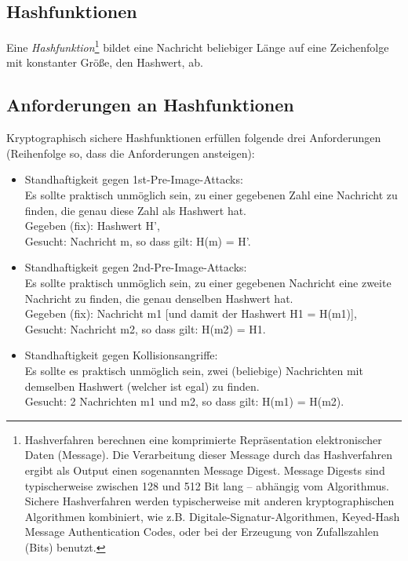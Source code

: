 \begin{refsegment}
\section{Hashfunktionen}
Eine {\em Hashfunktion}\footnote{%
Hashverfahren berechnen eine komprimierte Repräsentation
elektronischer Daten (Message).
Die Verarbeitung dieser Message durch das Hashverfahren ergibt als Output
einen sogenannten Message Digest. Message Digests sind typischerweise
zwischen 128 und 512 Bit lang -- abhängig vom Algorithmus.
Sichere Hashverfahren werden typischerweise mit anderen kryptographischen
Algorithmen kombiniert, wie z.B. Digitale-Signatur-Algorithmen,
Keyed-Hash Message Authentication Codes, oder bei der Erzeugung von
Zufallszahlen (Bits) benutzt.
}
bildet eine Nachricht beliebiger Länge auf eine Zeichenfolge mit
konstanter Größe, den 
Hashwert, ab.



\subsection{Anforderungen an Hashfunktionen}

Kryptographisch sichere Hashfunktionen erfüllen folgende drei Anforderungen
(Reihenfolge so, dass die Anforderungen ansteigen):
\begin{itemize}
 \item Standhaftigkeit gegen 1st-Pre-Image-Attacks:
       \\
      Es sollte praktisch unmöglich sein, zu einer gegebenen Zahl eine
      Nachricht zu finden, die genau diese Zahl als Hashwert hat.\\
      Gegeben (fix): Hashwert H',\\
      Gesucht: Nachricht m, so dass gilt: H(m) = H'.
 \item Standhaftigkeit gegen 2nd-Pre-Image-Attacks:
       \\
      Es sollte praktisch unmöglich sein, zu einer gegebenen Nachricht
      eine zweite Nachricht zu finden, die genau denselben Hashwert hat.\\
      Gegeben (fix): Nachricht m1 [und damit der Hashwert H1 = H(m1)],\\
      Gesucht: Nachricht m2, so dass gilt: H(m2) = H1.
 \item Standhaftigkeit gegen Kollisionsangriffe:
      \\
      Es sollte es praktisch unmöglich sein, zwei (beliebige) Nachrichten
      mit demselben Hashwert (welcher ist egal) zu finden.\\
      Gesucht: 2 Nachrichten m1 und m2, so dass gilt: H(m1) = H(m2).
\end{itemize}





\end{refsegment}
